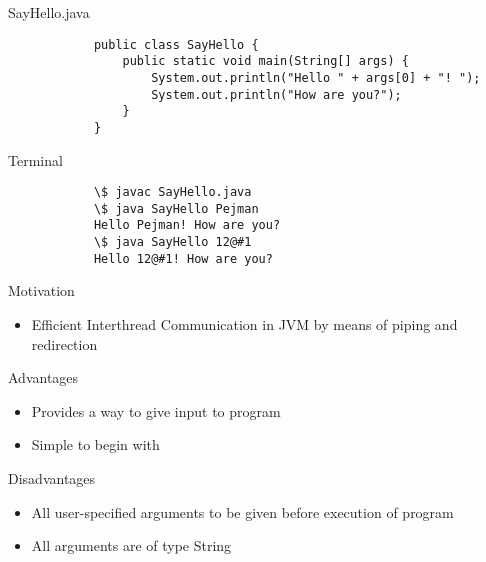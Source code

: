 \documentclass[10pt, compress]{beamer}
\begin{document}
\begin{slide}
	\begin{block}{SayHello.java}
		\begin{verbatim}
			public class SayHello {
			    public static void main(String[] args) {
			        System.out.println("Hello " + args[0] + "! ");
			        System.out.println("How are you?");
			    }
			}
		\end{verbatim}
	\end{block}
	\begin{block}{Terminal}
		\begin{verbatim}
			\$ javac SayHello.java
			\$ java SayHello Pejman
			Hello Pejman! How are you?
			\$ java SayHello 12@#1
			Hello 12@#1! How are you?
		\end{verbatim}
	\end{block}
\end{slide}

\begin{slide}
	\begin{block}{Motivation}
		\begin{itemize}
			\item[] Efficient Interthread Communication in JVM by means of piping and redirection
		\end{itemize}
	\end{block}
	\begin{block}{Advantages}
		\begin{itemize}
			\item[] Provides a way to give input to program
			\item[] Simple to begin with
		\end{itemize}
	\end{block}
	\begin{block}{Disadvantages}
		\begin{itemize}
			\item[] All user-specified arguments to be given before execution of program
			\item[] All arguments are of type String
		\end{itemize}
	\end{block}
\end{slide}

\end{document}
